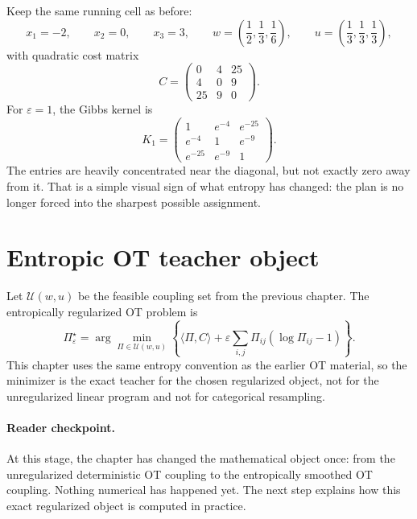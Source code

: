 Keep the same running cell as before:
\[
  x_1=-2,
  \qquad x_2=0,
  \qquad x_3=3,
  \qquad
  w=
  \left(
    \frac{1}{2},
    \frac{1}{3},
    \frac{1}{6}
  \right),
  \qquad
  u=
  \left(
    \frac{1}{3},
    \frac{1}{3},
    \frac{1}{3}
  \right),
\]
with quadratic cost matrix
\begin{equation}
\label{eq:bf-eot-running-cost}
  C
  =
  \begin{pmatrix}
    0 & 4 & 25 \\
    4 & 0 & 9 \\
    25 & 9 & 0
  \end{pmatrix}.
\end{equation}
For \(\varepsilon=1\), the Gibbs kernel is
\begin{equation}
\label{eq:bf-eot-running-kernel}
  K_1=
  \begin{pmatrix}
    1 & e^{-4} & e^{-25} \\
    e^{-4} & 1 & e^{-9} \\
    e^{-25} & e^{-9} & 1
  \end{pmatrix}.
\end{equation}
The entries are heavily concentrated near the diagonal, but not exactly zero away
from it.  That is a simple visual sign of what entropy has changed: the plan is no
longer forced into the sharpest possible assignment.

\section{Entropic OT teacher object}
\label{sec:bf-eot-teacher-object}

Let \(\mathcal U(w,u)\) be the feasible coupling set from the previous chapter.
The entropically regularized OT problem is
\begin{equation}
\label{eq:bf-eot-primal}
  \Pi_\varepsilon^\star
  =
  \arg\min_{\Pi\in\mathcal U(w,u)}
  \left\{
    \langle \Pi,C\rangle
    + \varepsilon\sum_{i,j}\Pi_{ij}(\log\Pi_{ij}-1)
  \right\}.
\end{equation}
This chapter uses the same entropy convention as the earlier OT material, so the
minimizer is the exact teacher for the chosen regularized object, not for the
unregularized linear program and not for categorical resampling.

\paragraph{Reader checkpoint.}
At this stage, the chapter has changed the mathematical object once: from the
unregularized deterministic OT coupling to the entropically smoothed OT coupling.
Nothing numerical has happened yet.  The next step explains how this exact
regularized object is computed in practice.


